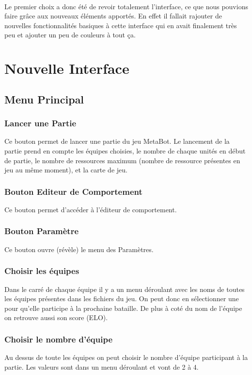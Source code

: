\documentclass{report}
\begin{document}
\paragraph{}
Le premier choix a donc été de revoir totalement l'interface, ce que nous pouvions faire grâce aux nouveaux éléments apportés. En effet il fallait rajouter de nouvelles fonctionnalités basiques à cette interface qui en avait finalement très peu et ajouter un peu de couleurs à tout ça.
\section{Nouvelle Interface}

\subsection{Menu Principal}
\subsubsection{Lancer une Partie}
Ce bouton permet de lancer une partie du jeu MetaBot. Le lancement de la partie prend en compte les équipes choisies, le nombre de chaque unités en début de partie, le nombre de ressources maximum (nombre de ressource présentes en jeu au même moment), et la carte de jeu.
\subsubsection{Bouton Editeur de Comportement}
Ce bouton permet d'accéder à l'éditeur de comportement.
\subsubsection{Bouton Paramètre}
Ce bouton ouvre (révèle) le menu des Paramètres.
\subsubsection{Choisir les équipes}
Dans le carré de chaque équipe il y a un menu déroulant avec les noms de toutes les équipes présentes dans les fichiers du jeu. On peut donc en sélectionner une pour qu'elle participe à la prochaine bataille.
De plus à coté du nom de l'équipe on retrouve aussi son score (ELO).
\subsubsection{Choisir le nombre d'équipe}
Au dessus de toute les équipes on peut choisir le nombre d'équipe participant à la partie. Les valeurs sont dans un menu déroulant et vont de 2 à 4.
\end{document}
